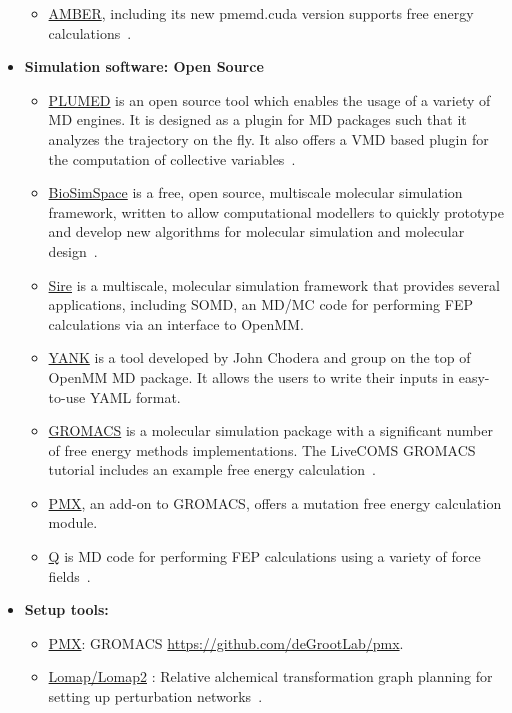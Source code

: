 \documentclass[9pt,bestpractices]{livecoms}
\begin{document}
\begin{itemize}
\begin{itemize}
	\item \href{https://ambermd.org/}{AMBER}, including its new pmemd.cuda version supports free energy calculations~\cite{salomon-ferrer2013overview}. 
	\end{itemize}
\item [] \textbf{Simulation software: Open Source}
	\begin{itemize}
	\item \href{https://www.plumed.org/}{PLUMED} is an open source tool which enables the usage of a variety of MD engines. It is designed as a plugin for MD packages such that it analyzes the trajectory on the fly. It also offers a VMD based plugin for the computation of collective variables~\cite{bonomi2019promoting}.   	
	\item \href{https://biosimspace.org/}{BioSimSpace} is a free, open source, multiscale molecular simulation framework, written to allow computational modellers to quickly prototype and develop new algorithms for molecular simulation and molecular design~\cite{hedges2019biosimspace}. 
	\item \href{https://siremol.org/}{Sire} is a multiscale, molecular simulation framework that provides several applications, including SOMD, an MD/MC code for performing FEP calculations via an interface to OpenMM. 
	\item \href{http://getyank.org/latest/index.html}{YANK} is a tool developed by John Chodera and group on the top of OpenMM MD package. It allows the users to write their inputs in easy-to-use YAML format.
	\item \href{http://www.gromacs.org/}{GROMACS} is a molecular simulation package with a significant number of free energy methods implementations. The LiveCOMS GROMACS tutorial includes an example free energy calculation~\cite{lemkul2018From}.
	\item \href{http://pmx.mpibpc.mpg.de/instructions.html}{PMX}, an add-on to GROMACS, offers a mutation free energy calculation module\cite{abraham2015gromacs}.
	\item \href{https://github.com/qusers/Q6}{Q} is MD code for performing FEP calculations using a variety of force fields~\cite{aqvistjohan2017q6}. 
	\end{itemize}
\item[] \textbf{Setup tools:}
	\begin{itemize}
	\item \href{http://pmx.mpibpc.mpg.de/instructions.html}{PMX}: GROMACS \url{https://github.com/deGrootLab/pmx}.
	\item \href{https://github.com/MobleyLab/Lomap}{Lomap/Lomap2} : Relative alchemical transformation graph planning for setting up perturbation networks~\cite{liu2013lead}.

\end{itemize}
\end{itemize}
\end{document}
